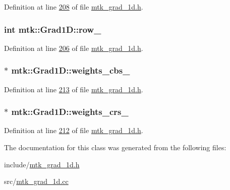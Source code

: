 Definition at line \hyperlink{mtk__grad__1d_8h_source_l00208}{208} of file \hyperlink{mtk__grad__1d_8h_source}{mtk\-\_\-grad\-\_\-1d.\-h}.

\hypertarget{classmtk_1_1Grad1D_a7947235d61d0dd27c5b81a81ca78d9a8}{
\subsubsection[{row\-\_\-}]{\setlength{\rightskip}{0pt plus 5cm}int mtk\-::\-Grad1\-D\-::row\-\_\-\hspace{0.3cm}{\ttfamily [private]}}}\label{classmtk_1_1Grad1D_a7947235d61d0dd27c5b81a81ca78d9a8}


Definition at line \hyperlink{mtk__grad__1d_8h_source_l00206}{206} of file \hyperlink{mtk__grad__1d_8h_source}{mtk\-\_\-grad\-\_\-1d.\-h}.

\hypertarget{classmtk_1_1Grad1D_ae6b0a908748923b2acd97e5bf7acc000}{
\subsubsection[{weights\-\_\-cbs\-\_\-}]{$\ast$ mtk\-::\-Grad1\-D\-::weights\-\_\-cbs\-\_\-\hspace{0.3cm}{\ttfamily [private]}}}\label{classmtk_1_1Grad1D_ae6b0a908748923b2acd97e5bf7acc000}


Definition at line \hyperlink{mtk__grad__1d_8h_source_l00213}{213} of file \hyperlink{mtk__grad__1d_8h_source}{mtk\-\_\-grad\-\_\-1d.\-h}.

\hypertarget{classmtk_1_1Grad1D_a96914abea78528b32499963ce9bbe4a6}{
\subsubsection[{weights\-\_\-crs\-\_\-}]{$\ast$ mtk\-::\-Grad1\-D\-::weights\-\_\-crs\-\_\-\hspace{0.3cm}{\ttfamily [private]}}}\label{classmtk_1_1Grad1D_a96914abea78528b32499963ce9bbe4a6}


Definition at line \hyperlink{mtk__grad__1d_8h_source_l00212}{212} of file \hyperlink{mtk__grad__1d_8h_source}{mtk\-\_\-grad\-\_\-1d.\-h}.



The documentation for this class was generated from the following files\-:\begin{DoxyCompactItemize}
\item 
include/\hyperlink{mtk__grad__1d_8h}{mtk\-\_\-grad\-\_\-1d.\-h}\item 
src/\hyperlink{mtk__grad__1d_8cc}{mtk\-\_\-grad\-\_\-1d.\-cc}\end{DoxyCompactItemize}
